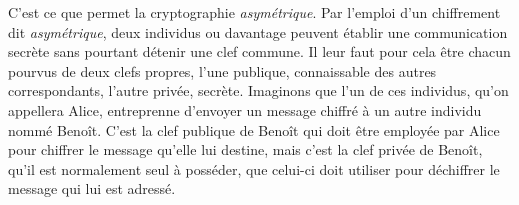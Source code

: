 C’est ce que permet la cryptographie \emph{asymétrique}.
Par l’emploi d’un chiffrement dit \emph{asymétrique}, deux individus ou davantage peuvent établir une communication secrète sans pourtant détenir une clef commune.
Il leur faut pour cela être chacun pourvus de deux clefs propres, l’une publique, connaissable des autres correspondants, l’autre privée, secrète. 
Imaginons que l’un de ces individus, qu’on appellera Alice, entreprenne d’envoyer un message chiffré à un autre individu nommé Benoît. C’est la clef publique de Benoît qui doit être employée par Alice pour chiffrer le message qu’elle lui destine, mais c’est la clef privée de Benoît, qu’il est normalement seul à posséder, que celui-ci doit utiliser pour déchiffrer le message qui lui est adressé.
















